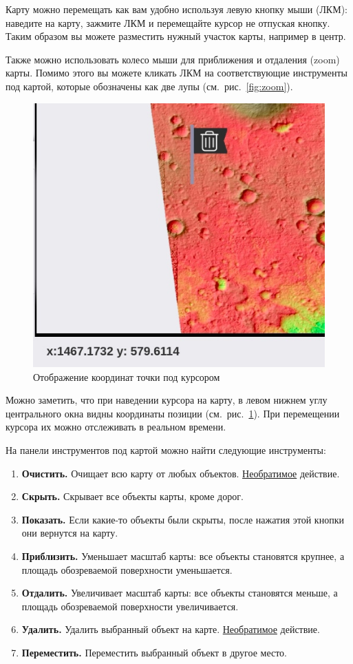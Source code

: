 Карту можно перемещать как вам удобно используя левую кнопку мыши (ЛКМ): наведите на карту, зажмите ЛКМ и перемещайте курсор не отпуская кнопку. Таким образом вы можете разместить нужный участок карты, например в центр.

Также можно использовать колесо мыши для приближения и отдаления (zoom) карты. Помимо этого вы можете кликать ЛКМ на соответствующие инструменты под картой, которые обозначены как две лупы (см.~рис.~\ref{fig:zoom}).

\begin{figure}[h!]
	\centering
	\includegraphics[width=.5\linewidth]{./img/coordinates}
	\caption{Отображение координат точки под курсором}\label{fig:coordinates}
\end{figure}

Можно заметить, что при наведении курсора на карту, в левом нижнем углу центрального окна видны координаты позиции (см.~рис.~\ref{fig:coordinates}). При перемещении курсора их можно отслеживать в реальном времени.

На панели инструментов под картой можно найти следующие инструменты: 

\begin{enumerate}
	\item \textbf{Очистить.} Очищает всю карту от любых объектов. \underline{Необратимое} действие.
	\item \textbf{Скрыть.} Скрывает все объекты карты, кроме дорог.
	\item \textbf{Показать.} Если какие-то объекты были скрыты, после нажатия этой кнопки они вернутся на карту.
	\item \textbf{Приблизить.} Уменьшает масштаб карты: все объекты становятся крупнее, а площадь обозреваемой поверхности уменьшается.
	\item \textbf{Отдалить.} Увеличивает масштаб карты: все объекты становятся меньше, а площадь обозреваемой поверхности увеличивается.
	\item \textbf{Удалить.} Удалить выбранный объект на карте. \underline{Необратимое} действие.
	\item \textbf{Переместить.} Переместить выбранный объект в другое место.
\end{enumerate}



%

